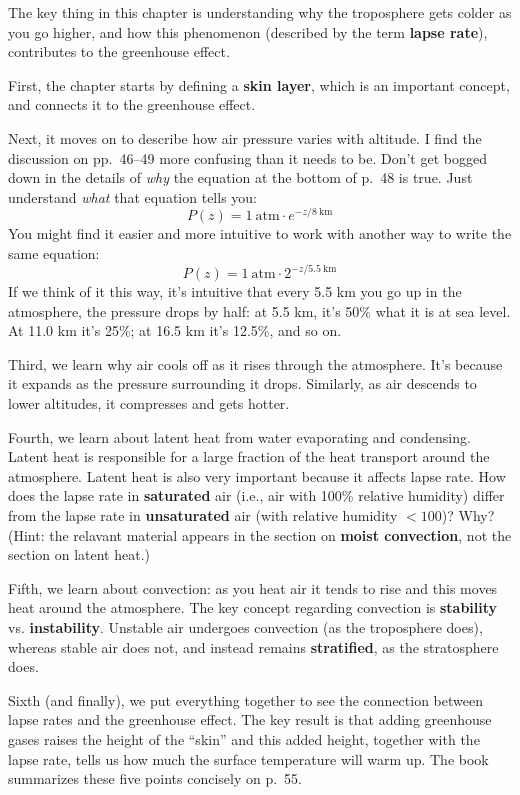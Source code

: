 \documentclass[
]{article}
\begin{document}
The key thing in this chapter is understanding why the troposphere gets
colder as you go higher, and how this phenomenon (described by the term
\textbf{lapse rate}), contributes to the greenhouse effect.

First, the chapter starts by defining a \textbf{skin layer}, which is an
important concept, and connects it to the greenhouse effect.

Next, it moves on to describe how air pressure varies with altitude. I
find the discussion on pp.~46--49 more confusing than it needs to be.
Don't get bogged down in the details of \emph{why} the equation at the
bottom of p.~48 is true. Just understand \emph{what} that equation tells
you: \[
  P(z) = 1~\text{atm}\cdot e^{-z/8~\text{km}}
\] You might find it easier and more intuitive to work with another way
to write the same equation: \[
  P(z) = 1~\text{atm}\cdot 2^{-z/5.5~\text{km}}
\] If we think of it this way, it's intuitive that every 5.5 km you go
up in the atmosphere, the pressure drops by half: at 5.5 km, it's 50\%
what it is at sea level. At 11.0 km it's 25\%; at 16.5 km it's 12.5\%,
and so on.

Third, we learn why air cools off as it rises through the atmosphere.
It's because it expands as the pressure surrounding it drops. Similarly,
as air descends to lower altitudes, it compresses and gets hotter.

Fourth, we learn about latent heat from water evaporating and
condensing. Latent heat is responsible for a large fraction of the heat
transport around the atmosphere. Latent heat is also very important
because it affects lapse rate. How does the lapse rate in
\textbf{saturated} air (i.e., air with 100\% relative humidity) differ
from the lapse rate in \textbf{unsaturated} air (with relative humidity
\(<100%
\))? Why? (Hint: the relavant material appears in the section on
\textbf{moist convection}, not the section on latent heat.)

Fifth, we learn about convection: as you heat air it tends to rise and
this moves heat around the atmosphere. The key concept regarding
convection is \textbf{stability} vs. \textbf{instability}. Unstable air
undergoes convection (as the troposphere does), whereas stable air does
not, and instead remains \textbf{stratified}, as the stratosphere does.

Sixth (and finally), we put everything together to see the connection
between lapse rates and the greenhouse effect. The key result is that
adding greenhouse gases raises the height of the ``skin'' and this added
height, together with the lapse rate, tells us how much the surface
temperature will warm up. The book summarizes these five points
concisely on p.~55.
\end{document}
